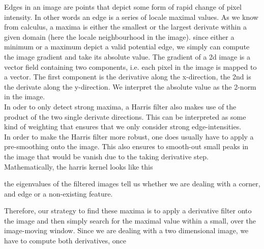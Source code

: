 \documentclass[conference]{IEEEtran}
\begin{document}
Edges in an image are points that depict some form of rapid change of pixel intensity. In other words an edge is a series of locale maximal values. As we know from calculus, a maxima is either the smallest or the largest derivate within a given domain (here the locale neighbourhood in the image). since either a minimum or a maximum depict a valid potential edge, we simply can compute the image gradient and take its absolute value. The gradient of a 2d image is a vector field containing two components, i.e. each pixel in the image is mapped to a vector. The first component is the derivative along the x-direction, the 2nd is the derivate along the y-direction. We interpret the absolute value as the 2-norm in the image. \\
In oder to only detect strong maxima, a Harris filter also makes use of the product of the two single derivate directions. This can be interpreted as some kind of weighting that ensures that we only consider strong edge-intensities. \\
In order to make the Harris filter more robust, one does usually have to apply a pre-smoothing onto the image. This also ensures to smooth-out small peaks in the image that would be vanish due to the taking derivative step. \\
Mathematically, the harris kernel looks like this

the eigenvalues of the filtered images tell us whether we are dealing with a corner, and edge or a non-existing feature.   


Therefore, our strategy to find these maxima is to apply a derivative filter onto the image and then simply search for the maximal value within a small, over the image-moving window. Since we are dealing with a two dimensional image, we have to compute both derivatives, once 
\end{document}
